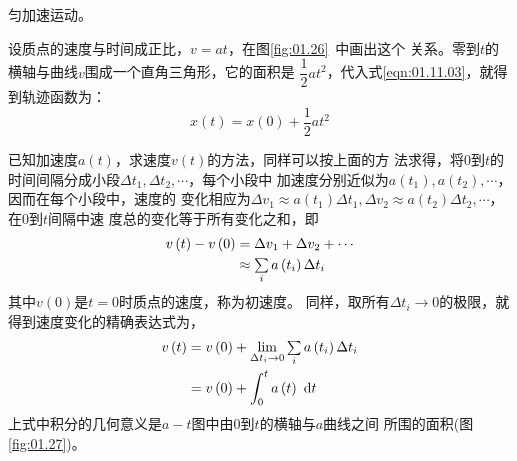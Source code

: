 \vspace{-1em}\example 匀加速运动。

设质点的速度与时间成正比，$v=at$，在图\ref{fig:01.26}~中画出这个
关系。零到$t$的横轴与曲线$v$围成一个直角三角形，它的面积是
$\dfrac{1}{2} a t^2$，代入式\eqref{eqn:01.11.03}，就得到轨迹函数为：
\begin{equation*}\label{eqn:01.11.04i}
  x\left(t\right)=x\left(0\right)+\frac{1}{2}at^2 \tag{1.11.4$'$}
\end{equation*}

已知加速度$a\left(t\right)$，求速度$v\left(t\right)$的方法，同样可以按上面的方
法求得，将0到$t$的时间间隔分成小段$\Delta t_1 , \Delta t_2 , \cdots$，每个小段中
加速度分别近似为$a\left(t_1\right) , a\left(t_2\right) , \cdots$，因而在每个小段中，速度的
变化相应为$\Delta v_1\approx a\left(t_1\right)\Delta t_1 , \Delta v_2\approx a\left(t_2\right)\Delta t_2 , \cdots$，在0到$t$间隔中速
度总的变化等于所有变化之和，即
\begin{equation}\label{eqn:01.11.05}
  \begin{aligned}
    v\left(t\right)-v\left(0\right) & =\Delta v_{1}+\Delta v_{2}+\cdots                 \\
                                    & \approx \textstyle\sum\limits_{i} a\left(t_{i}\right) \Delta t_{i}
  \end{aligned}
\end{equation}
其中$v\left(0\right)$是$t=0$时质点的速度，称为初速度。
同样，取所有$\Delta t _ i \to 0$的极限，就得到速度变化的精确表达式为，
\begin{equation}\label{eqn:01.11.06}
  \begin{aligned}
    v\left(t\right) & =v\left(0\right)+\lim _{\Delta t_{i} \rightarrow 0} \textstyle\sum\limits _ i a\left(t_{i}\right) \Delta t_{i} \\
                    & =v\left(0\right)+\int_{0}^{t} a\left(t\right) {~\mathrm d}  t
  \end{aligned}
\end{equation}
上式中积分的几何意义是$a-t$图中由0到$t$的横轴与$a$曲线之间
所围的面积(图\ref{fig:01.27})。


